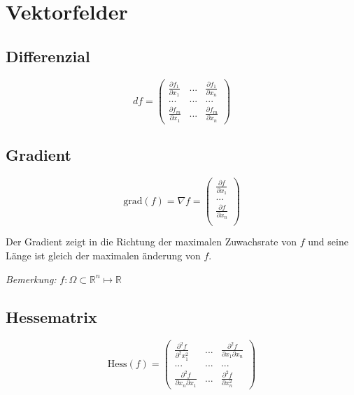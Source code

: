\documentclass[11pt]{article}
\begin{document}
\section{Vektorfelder}

\subsection{Differenzial}

\begin{equation*}
	df = \begin{pmatrix}
		\frac{\partial f_1}{\partial x_1} & ... & \frac{\partial f_1}{\partial x_n} \\
		... & ... & ... \\
		\frac{\partial f_m}{\partial x_1} & ... & \frac{\partial f_m}{\partial x_n}
	\end{pmatrix}
\end{equation*}

\subsection{Gradient}

\begin{equation*}
	\text{grad}(f)=\nabla f=
	\begin{pmatrix}
		\frac{\partial f}{\partial x_1}\\
		...\\
		\frac{\partial f}{\partial x_n}\\
	\end{pmatrix}
\end{equation*}

Der Gradient zeigt in die Richtung der maximalen Zuwachsrate von $f$ und seine L{\"a}nge ist gleich der maximalen {\"a}nderung von $f$.

\emph{Bemerkung:} $f:\Omega \subset \mathbb{R}^n \mapsto \mathbb{R}$

\subsection{Hessematrix}

\begin{equation*}
	\text{Hess}(f)=
	\begin{pmatrix}
		\frac{\partial^2 f}{\partial^2x_1^2} & ... & \frac{\partial^2 f}{\partial x_1 \partial x_n}\\
		...&...&...\\
		\frac{\partial^2 f}{\partial x_n \partial x_1} & ... & \frac{\partial^2 f}{\partial x_n^2}
	\end{pmatrix}
\end{equation*}
\end{document}
